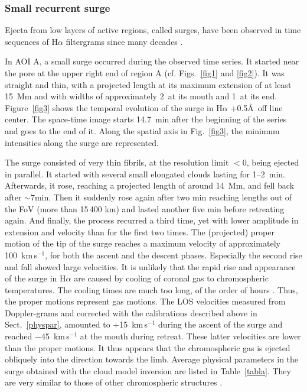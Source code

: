 \subsubsection*{Small recurrent surge\label{surge}}
Ejecta from low layers of active regions, called {surges}, have been observed in time sequences of H$\alpha$ filtergrams since many decades \citep[e.g.,][]{1977ASSL...69...97T}.

In AOI A, a small surge occurred during the observed time series. It started near the pore at the upper right end of region A (cf. Figs.~\ref{fig1} and \ref{fig2}). It was straight and thin, with a projected length at its maximum extension of at least 15~Mm and with widths of approximately 2\arcsec\ at its mouth and 1\arcsec\ at its end. Figure~\ref{fig3} shows the temporal evolution of the surge in H$\alpha$ +0.5\AA\ off line center. The space-time image starts 14.7~min after the beginning of the series and goes to the end of it. Along the spatial axis in Fig.~\ref{fig3}, the minimum intensities along the surge are represented. 





The surge consisted of very thin fibrils, at the resolution limit $<0$, being ejected in parallel. It started with several small elongated clouds lasting for 1--2~min. Afterwards, it rose, reaching a projected length of around 14~Mm, and fell back after $\sim7$min. Then it suddenly rose again after two min reaching lengths out of the FoV (more than 15\,400 km) and lasted another five min before retreating again. And finally, the process recurred a third time, yet with lower amplitude in extension and velocity than for the first two times. The (projected) proper motion of the tip of the surge reaches a maximum velocity of approximately 100~km\,s$^{-1}$, for both the ascent and the descent phases. Especially the second rise and fall showed large velocities. It is unlikely that the rapid rise and appearance of the surge in H$\alpha$ are caused by cooling of coronal gas to chromospheric temperatures. The cooling times are much too long, of the order of hours \citep{hildner74}. Thus, the proper motions represent gas motions. The LOS velocities measured from Doppler-grams and corrected with the calibrations described above in Sect.~\ref{physpar}, amounted to +15~km\,s$^{-1}$ during the ascent of the surge and reached $-$45~km\,s$^{-1}$ at the mouth during retreat. These latter velocities are lower than the proper motions. It thus appears that the chromospheric gas is ejected obliquely into the direction towards the limb. %
Average physical parameters in the surge obtained with the cloud model inversion are listed in Table~\ref{tabla}. They are very similar to those of other chromospheric structures \mbox{\citep[see e.g.][]{tsiropoula97}.}

